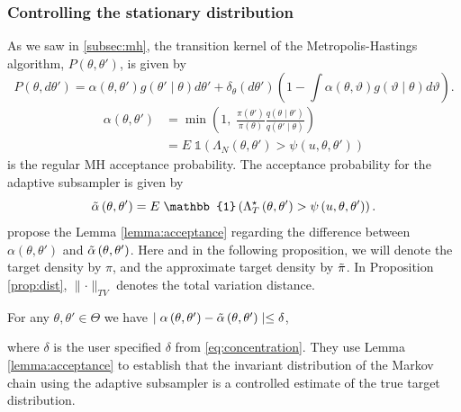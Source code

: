  \subsubsection{Controlling the stationary distribution}
 As we saw in \ref{subsec:mh}, the transition kernel of the Metropolis-Hastings algorithm,
 $P(\theta, \theta')$, is given by
 \begin{equation*}
     P\left(\theta, d\theta'\right) = \alpha\left(\theta, \theta'\right)g\left(\theta'\mid\theta\right)d\theta' + \delta_{\theta}\left(d\theta'\right)\left(1 - \int\alpha\left(\theta, \vartheta\right)g\left(\vartheta\mid\theta\right) d\vartheta\right). 
 \end{equation*}
\begin{equation*}
\begin{split}
     \alpha\left(\theta, \theta'\right) &= \min\left(1,\; \frac{\pi\left(\theta'\right)}{\pi\left(\theta\right)}\frac{q\left(\theta\mid\theta'\right)}{q\left(\theta'\mid\theta\right)} \right) \\
     & = E \;\mathbb{1} \left(\Lambda_N\left(\theta, \theta'\right)> \psi \left(u, \theta, \theta' \right)\right)
\end{split}     
\end{equation*}
is the regular MH acceptance probability. The acceptance probability for the adaptive subsampler is given by 
\begin{equation}\label{eq:approx_accept}
    \Tilde{\alpha}\left(\theta, \theta'\right) = E \; \mathbb{1} \left(\Lambda_T^{\star}\left(\theta, \theta'\right) > \psi\left(u, \theta, \theta'\right)\right). 
\end{equation} 
\cite{Bardenet:2} propose the Lemma \ref{lemma:acceptance} regarding the difference between $\alpha\left(\theta, \theta'\right)$ and $\Tilde{\alpha}\left(\theta, \theta'\right)$. Here and in the following proposition, we will denote the target density by $\pi$, and the approximate target density by $\Tilde{\pi}$. In Proposition \ref{prop:dist}, $\lVert \cdot \rVert_{TV}$ denotes the total variation distance.
\begin{lemma}\label{lemma:acceptance}
For any $\theta, \theta' \in \Theta$ we have $\mid \alpha\left(\theta,\theta'\right) - \Tilde{\alpha}\left(\theta,\theta'\right) \mid \leq \delta$,
\end{lemma}
where $\delta$ is the user specified $\delta$ from \eqref{eq:concentration}.  
They use Lemma \ref{lemma:acceptance} to establish that the invariant distribution of the Markov chain using the adaptive subsampler is a controlled estimate of the true target distribution. 
